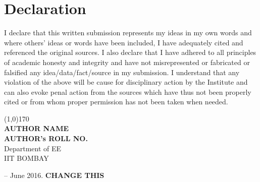 \chapter*{Declaration}
I declare that this written submission represents my ideas in my own words and where 
others' ideas or words have been included, I have adequately cited and referenced the original 
sources.  I also declare that I have adhered to all principles of academic honesty and integrity 
and   have   not   misrepresented   or   fabricated   or   falsified   any   idea/data/fact/source   in   my 
submission.  I understand that any violation of the above will be cause for disciplinary action 
by the Institute and can also evoke  penal action from the sources which have thus not been 
properly cited or from whom proper permission has not been taken when needed.

\vspace{3.0cm}
\begin{flushright}
\line(1,0){170}
\vspace*{10pt} \\
\textbf{AUTHOR NAME \\
AUTHOR's ROLL NO.}\\
Department of EE \\
IIT BOMBAY
\end{flushright}
\begin{flushleft}
-- June 2016. \textbf{CHANGE THIS}
\end{flushleft}
